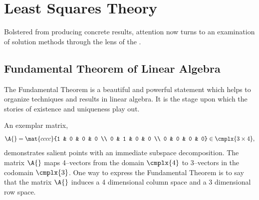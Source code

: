 \chapter{Least Squares Theory}

Bolstered from producing concrete results, attention now turns to an examination of solution methods through the lens of the \ft.

\section{Fundamental Theorem of Linear Algebra}  %
The Fundamental Theorem is a beautiful and powerful statement which helps to organize techniques and results in linear algebra. It is the stage upon which the stories of existence and uniqueness play out.

An exemplar matrix,
  \begin{equation*}   %
      \A{} = \mat{cccc}{1 & 0 & 0 & 0 \\ 0 & 1 & 0 & 0 \\ 0 & 0 & 0 & 0} \in \cmplx{3\times 4},
  \end{equation*}
demonstrates salient points with an immediate subspace decomposition. The matrix $\A{}$ maps 4--vectors from the domain $\cmplx{4}$ to 3--vectors in the codomain $\cmplx{3}$. One way to express the Fundamental Theorem is to say that the matrix $\A{}$ induces a 4 dimensional column space and a 3 dimensional row space. 

